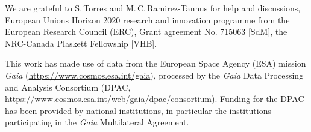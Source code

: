 \documentclass[apjl,twocolumn]{emulateapj}
\DeclareRobustCommand{\Figref}[1]{Fig.~\ref{#1}}
\begin{document}
 \begin{acknowledgements}
   \small
   We are grateful to S.\,Torres and M.\,C.\,Ramirez-Tannus
   for help and discussions, European Unions Horizon 2020 research and innovation programme from the European Research Council (ERC), Grant agreement No. 715063 [SdM], the NRC-Canada Plaskett Fellowship [VHB].
   
This work has made use of data from the European Space Agency (ESA) mission {\it Gaia} (\url{https://www.cosmos.esa.int/gaia}), processed by the {\it Gaia} Data Processing and Analysis Consortium (DPAC, \url{https://www.cosmos.esa.int/web/gaia/dpac/consortium}). Funding for the DPAC has been provided by national institutions, in particular the institutions
participating in the {\it Gaia} Multilateral Agreement. 
   
 \end{acknowledgements}
\end{document}
